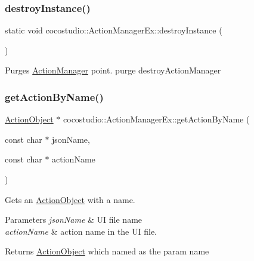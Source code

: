 \subsubsection{\texorpdfstring{destroy\+Instance()}{destroyInstance()}\hspace{0.1cm}{\footnotesize\ttfamily [2/2]}}
{\footnotesize\ttfamily static void cocostudio\+::\+Action\+Manager\+Ex\+::destroy\+Instance (\begin{DoxyParamCaption}{ }\end{DoxyParamCaption})\hspace{0.3cm}{\ttfamily [static]}}

Purges \hyperlink{classActionManager}{Action\+Manager} point.  purge  destroy\+Action\+Manager \mbox{\label{classcocostudio_1_1ActionManagerEx_a40087ddcdb2776834b69faca4d3a670c}} 
\subsubsection{\texorpdfstring{get\+Action\+By\+Name()}{getActionByName()}\hspace{0.1cm}{\footnotesize\ttfamily [1/2]}}
{\footnotesize\ttfamily \hyperlink{classcocostudio_1_1ActionObject}{Action\+Object} $\ast$ cocostudio\+::\+Action\+Manager\+Ex\+::get\+Action\+By\+Name (\begin{DoxyParamCaption}\item[{const char $\ast$}]{json\+Name,  }\item[{const char $\ast$}]{action\+Name }\end{DoxyParamCaption})}

Gets an \hyperlink{classcocostudio_1_1ActionObject}{Action\+Object} with a name.


\begin{DoxyParams}{Parameters}
{\em json\+Name} & UI file name\\
\hline
{\em action\+Name} & action name in the UI file.\\
\hline
\end{DoxyParams}
\begin{DoxyReturn}{Returns}
\hyperlink{classcocostudio_1_1ActionObject}{Action\+Object} which named as the param name 
\end{DoxyReturn}
\mbox{\label{classcocostudio_1_1ActionManagerEx_ac43c9de6ceb74500ca80ab711e1b0a39}} 
